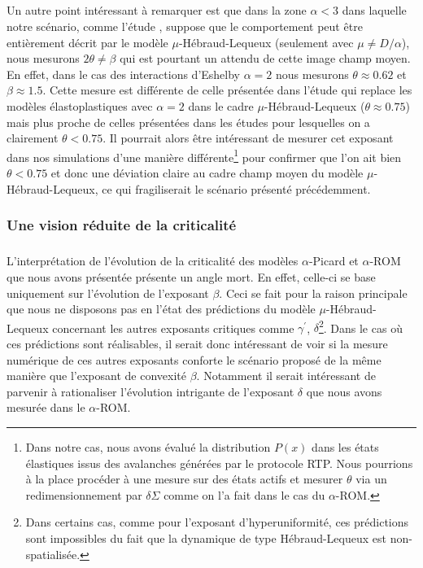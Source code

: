 \subparagraph{}Un autre point intéressant à remarquer est que dans la zone $\alpha < 3$ dans laquelle notre scénario, comme l'étude \cite{ferrero_criticality_2019}, suppose que le comportement peut être entièrement décrit par le modèle $\mu$-Hébraud-Lequeux (seulement avec $\mu \neq D/\alpha$), nous mesurons $2\theta \neq \beta$ qui est pourtant un attendu de cette image champ moyen. En effet, dans le cas des interactions d'Eshelby $\alpha = 2$ nous mesurons $\theta \approx 0.62$ et $\beta \approx 1.5$. Cette mesure est différente de celle présentée dans l'étude \cite{ferrero_criticality_2019} qui replace les modèles élastoplastiques avec $\alpha = 2$ dans le cadre $\mu$-Hébraud-Lequeux ($\theta \approx 0.75$) mais plus proche de celles présentées dans les études \cite{lin_scaling_2014, liu_driving_2016, lin_mean-field_2016} pour lesquelles on a clairement $\theta < 0.75$. Il pourrait alors être intéressant de mesurer cet exposant dans nos simulations d'une manière différente\footnote{Dans notre cas, nous avons évalué la distribution $P(x)$ dans les états élastiques issus des avalanches générées par le protocole RTP. Nous pourrions à la place procéder à une mesure sur des états actifs et mesurer $\theta$ via un redimensionnement par $\delta\Sigma$ comme on l'a fait dans le cas du $\alpha$-ROM.} pour confirmer que l'on ait bien $\theta < 0.75$ et donc une déviation claire au cadre champ moyen du modèle $\mu$-Hébraud-Lequeux, ce qui fragiliserait le scénario présenté précédemment.

\subsubsection{Une vision réduite de la criticalité}

\subparagraph{}L'interprétation de l'évolution de la criticalité des modèles $\alpha$-Picard et $\alpha$-ROM que nous avons présentée présente un angle mort. En effet, celle-ci se base uniquement sur l'évolution de l'exposant $\beta$. Ceci se fait pour la raison principale que nous ne disposons pas en l'état des prédictions du modèle $\mu$-Hébraud-Lequeux concernant les autres exposants critiques comme $\gamma^\prime$, $\delta$\footnote{Dans certains cas, comme pour l'exposant d'hyperuniformité, ces prédictions sont impossibles du fait que la dynamique de type Hébraud-Lequeux est non-spatialisée.}. Dans le cas où ces prédictions sont réalisables, il serait donc intéressant de voir si la mesure numérique de ces autres exposants conforte le scénario proposé de la même manière que l'exposant de convexité $\beta$. Notamment il serait intéressant de parvenir à rationaliser l'évolution intrigante de l'exposant $\delta$ que nous avons mesurée dans le $\alpha$-ROM.

